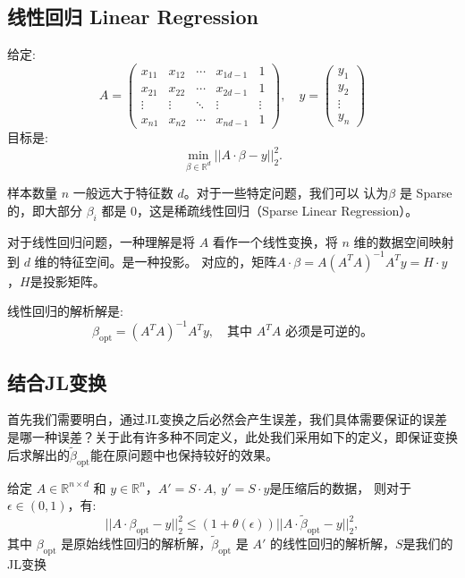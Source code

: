 \documentclass[lang=cn,newtx,10pt,scheme=chinese,chinesefont=nofont,citestyle=gb7714-2015, bibstyle=gb7714-2015]{elegantbook}
\begin{document}
\begin{refsection}
\subsection{线性回归 Linear Regression}

给定:
$$
A = \begin{pmatrix} 
    x_{11} & x_{12} & \cdots & x_{1d-1} & 1 \\ 
    x_{21} & x_{22} & \cdots & x_{2d-1} & 1\\ 
    \vdots & \vdots & \ddots & \vdots & \vdots\\ 
    x_{n1} & x_{n2} & \cdots & x_{nd-1} & 1 
\end{pmatrix}, \quad 
y = \begin{pmatrix} 
    y_1 \\ y_2 \\ \vdots \\ y_n 
\end{pmatrix} 
$$
目标是:
\[ \min_{\beta \in \mathbb{R}^d} || A \cdot \beta - y ||_2^2. \]

\begin{remark}
    样本数量 $n$ 一般远大于特征数 $d$。对于一些特定问题，我们可以
    认为$\beta$ 是 Sparse 的，即大部分 $\beta_i$ 都是 $0$，这是稀疏线性回归（Sparse Linear Regression）。

    对于线性回归问题，一种理解是将 $A$ 看作一个线性变换，将 $n$ 维的数据空间映射到 $d$ 维的特征空间。是一种投影。
    对应的，矩阵$A\cdot\beta=A(A^T A)^{-1} A^T y = H\cdot y$，$H$是投影矩阵。
\end{remark}

\noindent 线性回归的解析解是:
\[ \beta_{\text{opt}} = (A^T A)^{-1} A^T y, \quad \text{其中 $A^T A$ 必须是可逆的。} \]


\subsection{结合JL变换}

首先我们需要明白，通过JL变换之后必然会产生误差，我们具体需要保证的误差是哪一种误差？关于此有许多种不同定义，此处我们采用如下的定义，即保证变换后求解出的$\widetilde{\beta}_{\text{opt}}$能在原问题中也保持较好的效果。
\begin{theorem}
    给定 $A \in \mathbb{R}^{n \times d}$ 和 $y \in \mathbb{R}^n$，$A'=S\cdot A,\ y'=S\cdot y$是压缩后的数据，
    则对于 $\epsilon \in (0, 1)$，有:
    \[ || A \cdot \beta_{\text{opt}} - y ||_2^2 \leq (1 + \theta(\epsilon)) || A \cdot \widetilde{\beta}_{\text{opt}} - y ||_2^2, \]
    其中 $\beta_{\text{opt}}$ 是原始线性回归的解析解，$\widetilde{\beta}_{\text{opt}}$ 是 $A'$ 的线性回归的解析解，$S$是我们的JL变换
\end{theorem}


\end{refsection}
\end{document}
